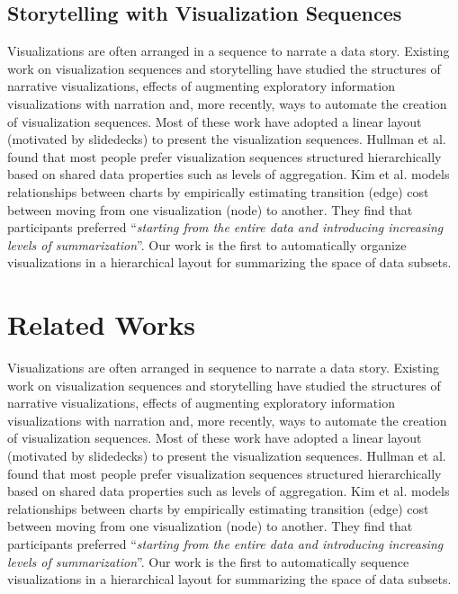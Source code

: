\subsection{Storytelling with Visualization Sequences}
Visualizations are often arranged in a sequence to narrate a data story. Existing work on visualization sequences and storytelling have studied the structures of narrative visualizations\cite{Segel2010,Hullman2017}, effects of augmenting exploratory information visualizations with narration\cite{Boy2015} and, more recently, ways to automate the creation of visualization sequences\cite{Hullman2013,Kim2017}. Most of these work have adopted a linear layout (motivated by slidedecks) to present the visualization sequences. Hullman et al. \cite{Hullman2017} found that most people prefer visualization sequences structured hierarchically based on shared data properties such as levels of aggregation. Kim et al. \cite{Kim2017} models relationships between charts by empirically estimating transition (edge) cost between moving from one visualization (node) to another. They find that participants preferred ``\textit{starting from the entire data and introducing increasing levels of summarization}''. Our work is the first to automatically organize visualizations in a hierarchical layout for summarizing the space of data subsets.


\iffalse
\section{Related Works}
\npar {}
Visualizations are often arranged in sequence to narrate a data story. Existing work on visualization sequences and storytelling have studied the structures of narrative visualizations\cite{Segel2010,Hullman2017}, effects of augmenting exploratory information visualizations with narration\cite{Boy2015} and, more recently, ways to automate the creation of visualization sequences\cite{Hullman2013,Kim2017}. Most of these work have adopted a linear layout (motivated by slidedecks) to present the visualization sequences. Hullman et al. \cite{Hullman2017} found that most people prefer visualization sequences structured hierarchically based on shared data properties such as levels of aggregation. %
Kim et al. \cite{Kim2017} models relationships between charts by empirically estimating transition (edge) cost between moving from one visualization (node) to another. They find that participants preferred ``\textit{starting from the entire data and introducing increasing levels of summarization}''. Our work is the first to automatically sequence visualizations in a hierarchical layout for summarizing the space of data subsets. %

